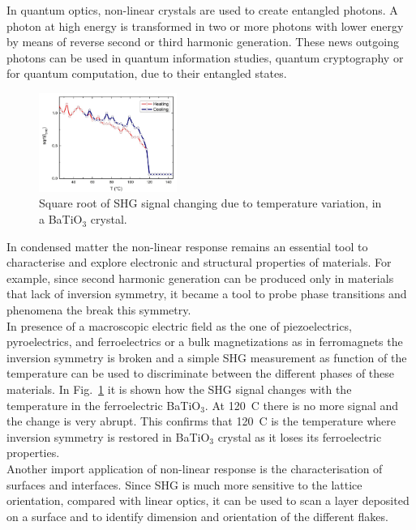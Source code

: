   
In quantum optics, non-linear crystals are used to create entangled photons. A photon at high energy is transformed in two or more photons with lower energy by means of reverse second or third harmonic generation. These news outgoing photons can be used in quantum information studies, quantum cryptography or for quantum computation, due to their entangled states.\cite{PhysRevLett.75.4337}\\ 
\begin{figure}
    \vspace{-0.7cm}
  \begin{center}
    \includegraphics[width=0.4\textwidth]{Figures/ferroelectric}
  \end{center}
  \caption{Square root of SHG signal changing due to temperature variation, in a BaTiO$_3$ crystal. \label{ferroelectric}}
\end{figure}
In condensed matter the non-linear response remains an essential tool to characterise and explore electronic and structural properties of materials. 
For example, since second harmonic generation can be produced only in materials that lack of inversion symmetry, it became a tool to probe phase transitions and phenomena the break this symmetry. \\
In presence of a macroscopic electric field as the one of piezoelectrics, pyroelectrics, and ferroelectrics or a bulk magnetizations as in ferromagnets the inversion symmetry is broken and a simple SHG measurement as function of the temperature can be used to discriminate between the different phases of these materials. In Fig.~\ref{ferroelectric} it is shown how the SHG signal changes with the temperature in the ferroelectric BaTiO$_3$. At 120\degree~C there is no more signal and the change is very abrupt. 
This confirms that 120\degree~C is the temperature where inversion symmetry is restored in BaTiO$_3$ crystal as it loses its ferroelectric properties.\\
Another import application of non-linear response is the characterisation of surfaces and interfaces. Since SHG is much more sensitive to the lattice orientation, compared with linear optics, it can be used to scan a layer deposited on a surface and to identify  dimension and orientation of the different flakes. 
